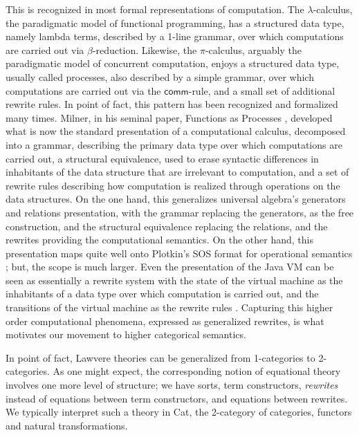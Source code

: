 \documentclass{llncs}
\begin{document}
  This is recognized in most formal representations of
  computation. The $\lambda$-calculus, the paradigmatic model of
  functional programming, has a structured data type, namely lambda
  terms, described by a 1-line grammar, over which computations are
  carried out via $\beta$-reduction. Likewise, the $\pi$-calculus,
  arguably the paradigmatic model of concurrent computation, enjoys a
  structured data type, usually called processes, also described by a
  simple grammar, over which computations are carried out via the
  $\mathsf{comm}$-rule, and a small set of additional rewrite
  rules. In point of fact, this pattern has been recognized and
  formalized many times. Milner, in his seminal paper, Functions as
  Processes \cite{DBLP:journals/mscs/Milner92}, developed what is now
  the standard presentation of a computational calculus, decomposed
  into a grammar, describing the primary data type over which
  computations are carried out, a structural equivalence, used to
  erase syntactic differences in inhabitants of the data structure
  that are irrelevant to computation, and a set of rewrite rules
  describing how computation is realized through operations on the
  data structures. On the one hand, this generalizes universal
  algebra's generators and relations presentation, with the grammar
  replacing the generators, as the free construction, and the
  structural equivalence replacing the relations, and the rewrites
  providing the computational semantics. On the other hand, this
  presentation maps quite well onto Plotkin's SOS format for
  operational semantics \cite{Plotkin04theorigins}; but, the scope is
  much larger. Even the presentation of the Java VM can be seen as
  essentially a rewrite system with the state of the virtual machine
  as the inhabitants of a data type over which computation is carried
  out, and the transitions of the virtual machine as the rewrite rules
  \cite{DBLP:conf/oopsla/IgarashiPW99}. Capturing this higher order
  computational phenomena, expressed as generalized rewrites, is what
  motivates our movement to higher categorical semantics.

  In point of fact, Lawvere theories can be generalized from
  1-categories to 2-categories.  As one might expect, the
  corresponding notion of equational theory involves one more level of
  structure; we have sorts, term constructors, {\em rewrites} instead
  of equations between term constructors, and equations between
  rewrites.  We typically interpret such a theory in Cat, the
  2-category of categories, functors and natural transformations.
\end{document}
